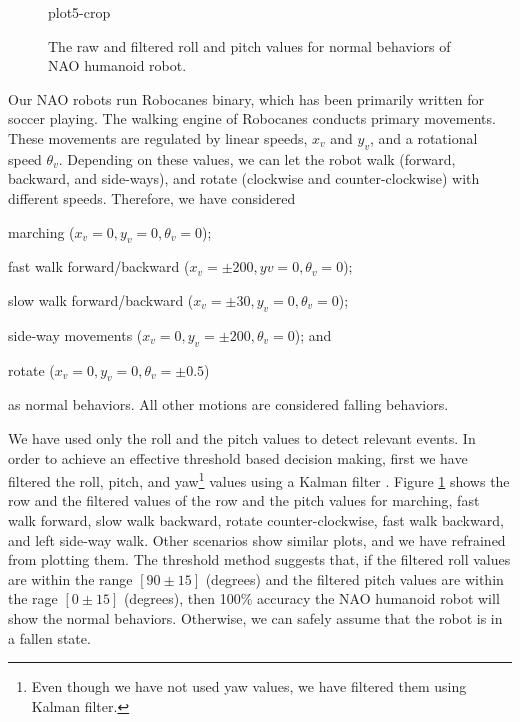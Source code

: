 \documentclass{llncs}
\begin{document}
\begin{sloppy}
\begin{figure}[!t]
{       {plot5-crop}}
  \caption{The raw and filtered roll and pitch values for normal behaviors of NAO humanoid robot.}
  \label{fig:normalBehavior}
\vspace{-6mm}
\end{figure}

Our NAO robots run {\sf Robocanes} binary, which has been primarily written for soccer
playing. The walking engine of {\sf Robocanes} conducts primary movements. These movements are
regulated by linear speeds, $x_v$ and $y_v$, and a rotational speed $\theta_v$. Depending on these
values, we can let the robot walk (forward, backward, and side-ways), and rotate (clockwise and
counter-clockwise) with different speeds. Therefore, we have considered \begin{inparaenum}[(1)]
\item marching ($x_v = 0 , y_v = 0, \theta_v = 0$); \item fast walk forward/backward ($x_v = \pm200
, y v = 0, \theta_v = 0$); \item \item slow walk forward/backward ($x_v = \pm30 , y_v = 0, \theta_v
= 0$); \item side-way movements ($x_v = 0, y_v = \pm200, \theta_v = 0$); and  \item rotate
($x_v = 0 , y_v = 0, \theta_v = \pm 0.5$) \end{inparaenum} as normal behaviors. All other motions
are considered falling behaviors. 


We have used only the roll and the pitch values  to detect relevant events. In order to achieve an
effective threshold based decision making, first we have filtered the roll, pitch, and
yaw\footnote{Even though we have not used yaw values, we have filtered them using Kalman filter.}
values using a Kalman filter \cite{Welch:1995:IKF:897831}. Figure \ref{fig:normalBehavior} shows
the row and the filtered values of the row and the pitch values for marching, fast walk forward,
slow walk backward, rotate counter-clockwise, fast walk backward, and left side-way walk. Other
scenarios show similar plots, and we have refrained from plotting them. The threshold method
suggests that, if the filtered roll values are within the range $[90\pm15]$ (degrees) and the
filtered pitch values are within the rage $[0\pm15]$ (degrees), then 100\% accuracy the NAO humanoid
robot will show the normal behaviors. Otherwise, we can safely assume that the robot is in a fallen
state.   




\end{sloppy}
\end{document}
